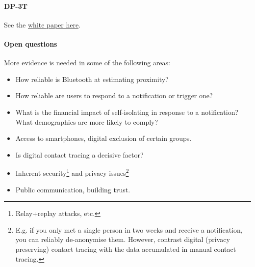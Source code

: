 \paragraph{DP-3T}
See the
\href{https://github.com/DP-3T/documents/blob/master/DP3T\%20White\%20Paper.pdf}{white
	paper here}.

\paragraph{Open questions}
More evidence is needed in some of the following areas:
\begin{itemize}
	\item How reliable is Bluetooth at estimating proximity?
	\item How reliable are users to respond to a notification or trigger one?
	\item What is the financial impact of self-isolating in response to a notification?
	      What demographics are more likely to comply?
	\item Access to smartphones, digital exclusion of certain groups.
	\item Is digital contact tracing a decisive factor?
	\item Inherent security\footnote{Relay+replay attacks, etc.} and privacy
	      issues\footnote{E.g. if you only met a single person in two weeks and receive a
		      notification, you can reliably de-anonymise them. However, contrast digital
		      (privacy preserving) contact tracing with the data accumulated in manual
		      contact tracing.}
	\item Public communication, building trust.
\end{itemize}